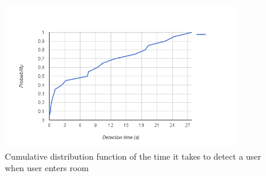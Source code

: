 \begin{figure}[h]
\centering
\includegraphics[width=0.9\textwidth]{Figures/room_detection_cumulative2}
\caption{Cumulative distribution function of the time it takes to detect a user when user enters room}
\label{eval:room2}
\end{figure}

